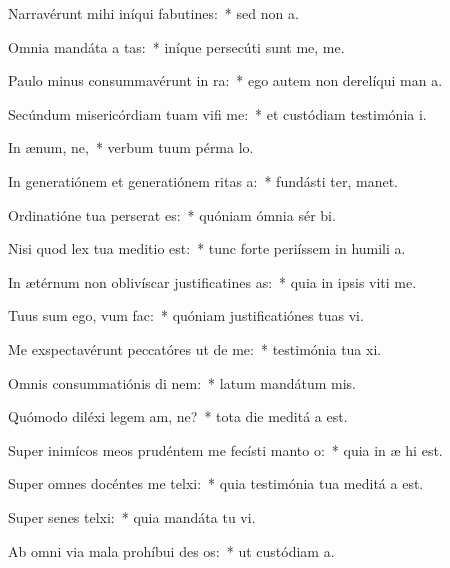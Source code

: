 \item Narravérunt mihi iníqui fabutines:~* sed non   a.
\item Omnia mandáta a tas:~* iníque persecúti sunt me,  me.
\item Paulo minus consummavérunt  in ra:~* ego autem non derelíqui man a.
\item Secúndum misericórdiam tuam vifi me:~* et custódiam testimónia  i.
\item In ænum, ne,~* verbum tuum pérma  lo.
\item In generatiónem et generatiónem ritas a:~* fundásti ter,  manet.
\item Ordinatióne tua perserat es:~* quóniam ómnia sér bi.
\item Nisi quod lex tua meditio  est:~* tunc forte periíssem in humili a.
\item In ætérnum non oblivíscar justificatines as:~* quia in ipsis viti me.
\item Tuus sum ego, vum  fac:~* quóniam justificatiónes tuas vi.
\item Me exspectavérunt peccatóres ut de me:~* testimónia tua xi.
\item Omnis consummatiónis di nem:~* latum mandátum  mis.
\item Quómodo diléxi legem am, ne?~* tota die meditá a est.
\item Super inimícos meos prudéntem me fecísti manto o:~* quia in æ hi est.
\item Super omnes docéntes me telxi:~* quia testimónia tua meditá a est.
\item Super senes telxi:~* quia mandáta tu vi.
\item Ab omni via mala prohíbui des os:~* ut custódiam  a.
